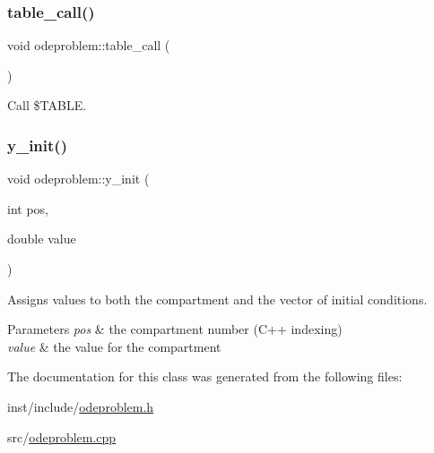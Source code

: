 \subsubsection{\texorpdfstring{table\+\_\+call()}{table\_call()}}
{\footnotesize\ttfamily void odeproblem\+::table\+\_\+call (\begin{DoxyParamCaption}{ }\end{DoxyParamCaption})}

Call \$\+T\+A\+B\+LE. \mbox{\label{classodeproblem_a258d7fdca6eb1b49cac25cea9fcca9c4}} 
\subsubsection{\texorpdfstring{y\+\_\+init()}{y\_init()}}
{\footnotesize\ttfamily void odeproblem\+::y\+\_\+init (\begin{DoxyParamCaption}\item[{int}]{pos,  }\item[{double}]{value }\end{DoxyParamCaption})}

Assigns values to both the compartment and the vector of initial conditions.


\begin{DoxyParams}{Parameters}
{\em pos} & the compartment number (C++ indexing) \\
\hline
{\em value} & the value for the compartment \\
\hline
\end{DoxyParams}


The documentation for this class was generated from the following files\+:\begin{DoxyCompactItemize}
\item 
inst/include/\hyperlink{odeproblem_8h}{odeproblem.\+h}\item 
src/\hyperlink{odeproblem_8cpp}{odeproblem.\+cpp}\end{DoxyCompactItemize}
